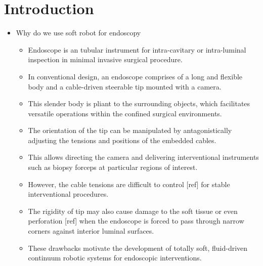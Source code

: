 \documentclass[journal,onecolumn]{IEEEtran}
\begin{document}
\section{Introduction}
\label{sec:orge82a4f9}
\begin{itemize}
\item Why do we use soft robot for endoscopy

\begin{itemize}
\item Endoscope is an tubular instrument for intra-cavitary or intra-luminal inspection in minimal invasive surgical procedure.

\item In conventional design, an endoscope comprises of a long and flexible body and a cable-driven steerable tip mounted with a camera.
\item This slender body is pliant to the surrounding objects, which facilitates versatile operations within the confined surgical environments.
\item The orientation of the tip can be manipulated by antagonistically adjusting the tensions and positions of the embedded cables.
\item This allows directing the camera and delivering interventional instruments such as biopsy forceps at particular regions of interest.

\item However, the cable tensions are difficult to control [ref] for stable interventional procedures.
\item The rigidity of tip may also cause damage to the soft tissue or even perforation [ref] when the endoscope is forced to pass through narrow corners against interior luminal surfaces.
\item These drawbacks motivate the development of totally soft, fluid-driven continuum robotic systems for endoscopic interventions.


\end{itemize}
\end{itemize}
\end{document}
